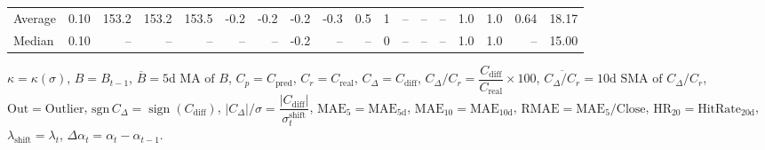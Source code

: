 \begin{threeparttable}
{\begin{tabular}{lrrrrrrrrrrrrrrrrr}
Average &     0.10 & 153.2 & 153.2 & 153.5 &       -0.2 &           -0.2 &                      -0.2 &                     -0.3 &                 0.5 &              1 &         -- &        -- &             -- &              1.0 &                 1.0 &            0.64 &                  18.17 \\
 Median &     0.10 &    -- &    -- &    -- &         -- &             -- &                      -0.2 &                       -- &                  -- &              0 &         -- &        -- &             -- &              1.0 &                 1.0 &              -- &                  15.00 \\
\bottomrule
\end{tabular}
}
\begin{tablenotes}\footnotesize
\item $\kappa=\kappa(\sigma)$, $B=B_{t-1}$, $\overline{B}=\text{5d MA of }B$, $C_p=C_{\text{pred}}$, $C_r=C_{\text{real}}$, $C_\Delta=C_{\text{diff}}$, $C_\Delta/C_r=\dfrac{C_{\text{diff}}}{C_{\text{real}}}\times100$, $\overline{C_\Delta/C_r}=\text{10d SMA of }C_\Delta/C_r$, $\mathrm{Out}=\text{Outlier}$, $\mathrm{sgn}\,C_\Delta=\operatorname{sign}(C_{\text{diff}})$, $|C_\Delta|/\sigma=\dfrac{|C_{\text{diff}}|}{\sigma_t^{\text{shift}}}$, $\mathrm{MAE}_5=\mathrm{MAE}_{5\text{d}}$, $\mathrm{MAE}_{10}=\mathrm{MAE}_{10\text{d}}$, $\mathrm{RMAE}= \mathrm{MAE}_5 / \text{Close}$, $\mathrm{HR}_{20}=\mathrm{HitRate}_{20\text{d}}$, $\lambda_{\text{shift}}=\lambda_t$, $\Delta\alpha_t=\alpha_t-\alpha_{t-1}$.
\end{tablenotes}
\end{threeparttable}
\endgroup

